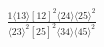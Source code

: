 \documentclass[varwidth, border=5pt]{standalone}
\begin{document}
\begin{my}
$\begin{gathered}
\scriptscriptstyle\frac{1⟨13⟩[12]^2⟨24⟩⟨25⟩^2}{⟨23⟩^2[25]^2⟨34⟩⟨45⟩^2}
\end{gathered}$
\end{my}
\end{document}
